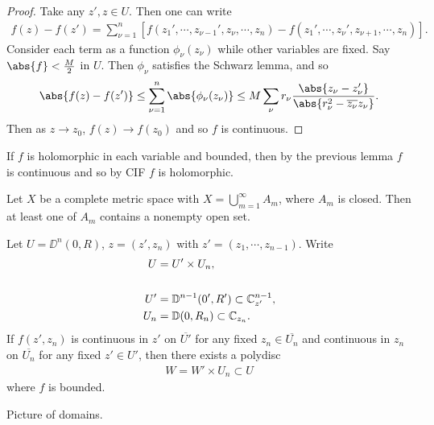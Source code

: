 \begin{proof}
    Take any $z',z \in U$. Then one can write
    \begin{align*}
        f(z) - f(z') = \sum_{\nu = 1}^n \left[ f(z_1' , \cdots, z_{\nu - 1}' , z_\nu , \cdots, z_n ) - f(z_1' , \cdots, z_{\nu}' , z_{\nu+1} , \cdots, z_n ) \right].
    \end{align*}
    Consider each term as a function $\phi_\nu (z_\nu)$ while other variables are fixed. Say $\abs{f} < \frac{M}{2}$ in $U$. Then $\phi_\nu$ satisfies the Schwarz lemma, and so
    \begin{align*}
        \abs{f(z) - f(z')} \leq \sum_{\nu = 1}^n \abs{ \phi_\nu (z_\nu)  } \leq M \sum_\nu r_\nu\frac{\abs{z_\nu - z_\nu'}}{\abs{r^2_\nu - \overline{z_\nu} z_\nu}}.
    \end{align*}
    Then as $z \to z_0$, $f(z) \to f(z_0)$ and so $f$ is continuous.
\end{proof}

\begin{note}
    If $f$ is holomorphic in each variable and bounded, then by the previous lemma $f$ is continuous and so by CIF $f$ is holomorphic.
\end{note}

\begin{theorem}[Baire]
    Let $X $ be a complete metric space with $X = \bigcup_{m=1}^\infty A_m$, where $A_m$ is closed. Then at least one of $A_m$ contains a nonempty open set.
\end{theorem}


\begin{lemma}[Osgood]
    Let $U = \DD^n(0,R)$, $z = (z' ,z_n)$ with $z' = (z_1, \cdots, z_{n-1})$. Write
    \begin{align*}
        U &= U' \times U_n,\\\\
        U' &= \mathbb{D}^{n-1}(0',R') \subset \mathbb{C}^{n-1}_{z'},\\
        U_n &= \mathbb{D}(0,R_n) \subset \mathbb{C}_{z_n}.
    \end{align*}
    If $f(z',z_n)$ is continuous in $z'$ on $\overline{U'}$ for any fixed $z_n \in \overline{U_n}$ and continuous in $z_n$ on $\overline{U_n}$ for any fixed $z' \in U'$, then there exists a polydisc
    \begin{align*}
        W = W' \times U_n \subset U
    \end{align*}
    where $f$ is bounded.
\end{lemma}

Picture of domains.


